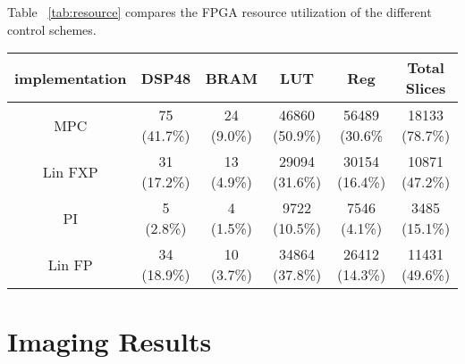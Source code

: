 \documentclass[journal,twocolumn,twoside]{IEEEtran}
\begin{document}
Table ~\ref{tab:resource} compares the FPGA resource utilization of the different control schemes.
\begin{table*}
  \caption{Resource utilization of the different control schemes. Each column shows the total amount of the resource used as well as the percent of the total available.}
  \begin{tabular}{cccccc}
    implementation & DSP48 & BRAM & LUT   & Reg & Total Slices \\
    \toprule
    MPC            & 75 (41.7\%)   & 24 (9.0\%)  & 46860 (50.9\%) & 56489 (30.6\% &   18133  (78.7\%)\\
    Lin FXP        & 31 (17.2\%)   & 13 (4.9\%)  & 29094  (31.6\%)& 30154  (16.4\%)& 10871  (47.2\%)\\
    PI             & 5  (2.8\%)    & 4  (1.5\%)  & 9722   (10.5\%)& 7546   (4.1\%) & 3485  (15.1\%)\\
    Lin FP         & 34 (18.9\%)   & 10 (3.7\%)  & 34864  (37.8\%)& 26412  (14.3\%)& 11431 (49.6\%)\\
  \end{tabular}
  \label{tab:resource}
\end{table*}

\newpage

\section{Imaging Results}\label{sec:imaging_results}




\renewcommand{\theequation}{A-\arabic{equation}}
\setcounter{equation}{0}  %
\setcounter{section}{0}
\end{document}

